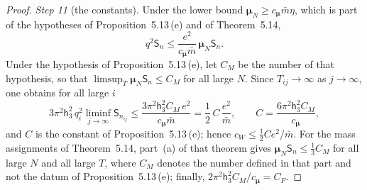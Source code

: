 \documentclass[11pt]{amsart}
\theoremstyle{definition}
\begin{document}
\begin{proof}
\emph{Step 11} (the constants).
Under the lower bound $\boldsymbol\mu_N\ge c_{\boldsymbol\mu}\bar m\eta$, which is part of the hypotheses of Proposition~5.13\,(e) and of Theorem~5.14,
\begin{equation*}
q^2\mathsf S_n\le\frac{e^2}{c_{\boldsymbol\mu}\bar m}\,\boldsymbol\mu_N\mathsf S_n.
\end{equation*}
Under the hypothesis of Proposition~5.13\,(e), let $C_M$ be the number of that hypothesis, so that $\limsup_T\boldsymbol\mu_N\mathsf S_n\le C_M$ for all large $N$.
Since $T_{ij}\to\infty$ as $j\to\infty$, one obtains for all large $i$
\begin{equation*}
3\pi^2\mathsf h_3^2\,q_i^2\liminf_{j\to\infty}\mathsf S_{n_{ij}}\le\frac{3\pi^2\mathsf h_3^2C_M\,e^2}{c_{\boldsymbol\mu}\bar m}=\frac12\,C\,\frac{e^2}{\bar m},\qquad C=\frac{6\pi^2\mathsf h_3^2C_M}{c_{\boldsymbol\mu}},
\end{equation*}
and $C$ is the constant of Proposition~5.13\,(e); hence $c_W\le\frac12Ce^2/\bar m$.
For the mass assignments of Theorem~5.14, part~(a) of that theorem gives $\boldsymbol\mu_N\mathsf S_n\le\frac13C_M$ for all large $N$ and all large $T$, where $C_M$ denotes the number defined in that part and not the datum of Proposition~5.13\,(e);
finally, $2\pi^2\mathsf h_3^2C_M/c_{\boldsymbol\mu}=C_F$.
\end{proof}
\end{document}
